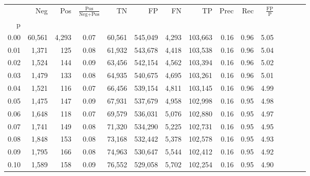 \begin{tabular}{rrrcrrrrrrrrrrr}
\toprule
{} &     Neg &     Pos & $\frac{\text{Pos}}{\text{Neg}+\text{Pos}}$ &       TN &       FP &       FN &       TP &  Prec &   Rec & $\frac{\text{FP}}{\text{P}}$ \\
p    &         &         &                                            &          &          &          &          &       &       &                              \\
\midrule
0.00 &  60,561 &   4,293 &                                       0.07 &   60,561 &  545,049 &    4,293 &  103,663 &  0.16 &  0.96 &                         5.05 \\
0.01 &   1,371 &     125 &                                       0.08 &   61,932 &  543,678 &    4,418 &  103,538 &  0.16 &  0.96 &                         5.04 \\
0.02 &   1,524 &     144 &                                       0.09 &   63,456 &  542,154 &    4,562 &  103,394 &  0.16 &  0.96 &                         5.02 \\
0.03 &   1,479 &     133 &                                       0.08 &   64,935 &  540,675 &    4,695 &  103,261 &  0.16 &  0.96 &                         5.01 \\
0.04 &   1,521 &     116 &                                       0.07 &   66,456 &  539,154 &    4,811 &  103,145 &  0.16 &  0.96 &                         4.99 \\
0.05 &   1,475 &     147 &                                       0.09 &   67,931 &  537,679 &    4,958 &  102,998 &  0.16 &  0.95 &                         4.98 \\
0.06 &   1,648 &     118 &                                       0.07 &   69,579 &  536,031 &    5,076 &  102,880 &  0.16 &  0.95 &                         4.97 \\
0.07 &   1,741 &     149 &                                       0.08 &   71,320 &  534,290 &    5,225 &  102,731 &  0.16 &  0.95 &                         4.95 \\
0.08 &   1,848 &     153 &                                       0.08 &   73,168 &  532,442 &    5,378 &  102,578 &  0.16 &  0.95 &                         4.93 \\
0.09 &   1,795 &     166 &                                       0.08 &   74,963 &  530,647 &    5,544 &  102,412 &  0.16 &  0.95 &                         4.92 \\
0.10 &   1,589 &     158 &                                       0.09 &   76,552 &  529,058 &    5,702 &  102,254 &  0.16 &  0.95 &                         4.90 \\

\end{tabular}
